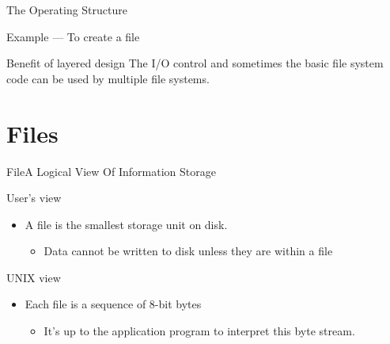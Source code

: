 \begin{frame}{The Operating Structure}
\begin{minipage}{.7\textwidth}
\begin{block}{Example --- To create a file}
\begin{enumerate}
\begin{enumerate}
        \end{enumerate}
      \end{enumerate}
    \end{block}
  \end{minipage}
  \begin{block}{Benefit of layered design}
    The I/O control and sometimes the basic file system code can be used by multiple file
    systems.
  \end{block}
\end{frame}

\section{Files}

\begin{frame}{File}{A Logical View Of Information Storage}
  \begin{block}{User's view}
    \begin{itemize}
    \item[] A file is the smallest storage unit on disk.
      \begin{itemize}
      \item Data cannot be written to disk unless they are within a file
      \end{itemize}
    \end{itemize}
  \end{block}
  \begin{block}{UNIX view}
    \begin{itemize}
    \item[] Each file is a sequence of 8-bit bytes
      \begin{itemize}
      \item It's up to the application program to interpret this byte stream.
      \end{itemize}
    \end{itemize}
  \end{block}
\end{frame}

